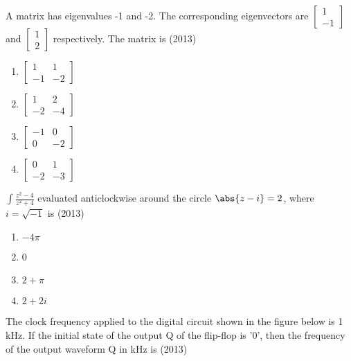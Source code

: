     \item A matrix has eigenvalues -1 and -2. The corresponding eigenvectors are $\begin{bmatrix}1\\-1\end{bmatrix}$ and $\begin{bmatrix}1\\2\end{bmatrix}$ respectively. The matrix is \hfill (2013)
    \begin{enumerate}[label=(\Alph*)]
        \item $\begin{bmatrix}1&1\\-1&-2\end{bmatrix}$
        \item $\begin{bmatrix}1&2\\-2&-4\end{bmatrix}$
        \item $\begin{bmatrix}-1&0\\0&-2\end{bmatrix}$
        \item $\begin{bmatrix}0&1\\-2&-3\end{bmatrix}$
    \end{enumerate}
    \item $\int\frac{z^2-4}{z^2+4}$  evaluated anticlockwise around the circle $\abs{z-i}=2$, where $i=\sqrt{-1}$ is \hfill (2013)
     \begin{enumerate}[label=(\Alph*)]
        \item $-4\pi$
        \item 0
        \item $2+\pi$
        \item $2+2i$
     \end{enumerate}
    \item The clock frequency applied to the digital circuit shown in the figure below is 1 kHz. If the initial
    state of the output Q of the flip-flop is '0', then the frequency of the output waveform Q in kHz is \hfill (2013)
